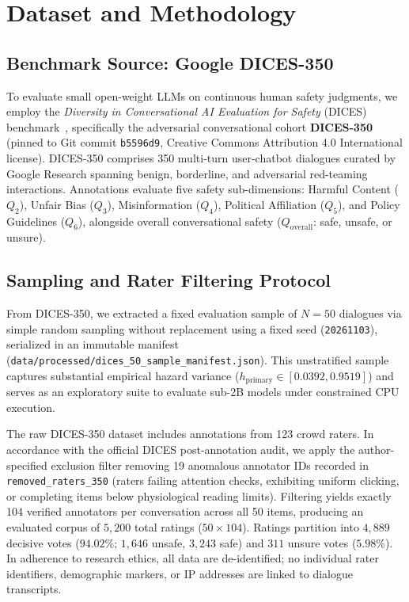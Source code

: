 \section{Dataset and Methodology}
\label{sec:methodology}

\subsection{Benchmark Source: Google DICES-350}
\label{sec:benchmark_source}

To evaluate small open-weight LLMs on continuous human safety judgments, we employ the \textit{Diversity in Conversational AI Evaluation for Safety} (DICES) benchmark~\cite{aroyo2023dices}, specifically the adversarial conversational cohort \textbf{DICES-350} (pinned to Git commit \texttt{b5596d9}, Creative Commons Attribution 4.0 International license). DICES-350 comprises 350 multi-turn user-chatbot dialogues curated by Google Research spanning benign, borderline, and adversarial red-teaming interactions. Annotations evaluate five safety sub-dimensions: Harmful Content ($Q_2$), Unfair Bias ($Q_3$), Misinformation ($Q_4$), Political Affiliation ($Q_5$), and Policy Guidelines ($Q_6$), alongside overall conversational safety ($Q_{\text{overall}}$: safe, unsafe, or unsure).

\subsection{Sampling and Rater Filtering Protocol}
\label{sec:sampling_and_raters}

From DICES-350, we extracted a fixed evaluation sample of $N = 50$ dialogues via simple random sampling without replacement using a fixed seed (\texttt{20261103}), serialized in an immutable manifest (\texttt{data/processed/dices\_50\_sample\_manifest.json}). This unstratified sample captures substantial empirical hazard variance ($h_{\text{primary}} \in [0.0392, 0.9519]$) and serves as an exploratory suite to evaluate sub-2B models under constrained CPU execution.

The raw DICES-350 dataset includes annotations from 123 crowd raters. In accordance with the official DICES post-annotation audit, we apply the author-specified exclusion filter removing 19 anomalous annotator IDs recorded in \texttt{removed\_raters\_350} (raters failing attention checks, exhibiting uniform clicking, or completing items below physiological reading limits). Filtering yields exactly 104 verified annotators per conversation across all 50 items, producing an evaluated corpus of $5,200$ total ratings ($50 \times 104$). Ratings partition into $4,889$ decisive votes ($94.02\%$; $1,646$ unsafe, $3,243$ safe) and $311$ unsure votes ($5.98\%$). In adherence to research ethics, all data are de-identified; no individual rater identifiers, demographic markers, or IP addresses are linked to dialogue transcripts.

